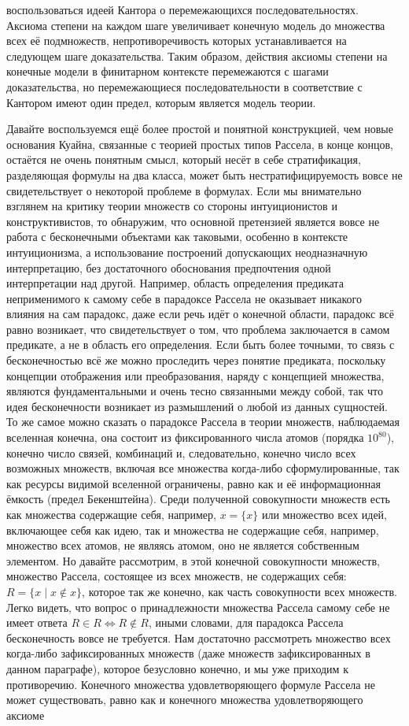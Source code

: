 \documentclass[12pt]{article}
\begin{document}
воспользоваться идеей Кантора о перемежающихся последовательностях. Аксиома степени на каждом шаге увеличивает конечную модель до множества всех её подмножеств, непротиворечивость которых устанавливается на следующем шаге доказательства. Таким образом, действия аксиомы степени на конечные модели в финитарном контексте перемежаются с шагами доказательства, но перемежающиеся последовательности в соответствие с Кантором имеют один предел, которым является модель теории. 

Давайте воспользуемся ещё более простой и понятной конструкцией, чем новые основания Куайна, связанные с теорией простых типов Рассела, в конце концов, остаётся не очень понятным смысл, который несёт в себе стратификация, разделяющая формулы на два класса, может быть нестратифицируемость вовсе не свидетельствует о некоторой проблеме в формулах. Если мы внимательно взглянем на критику теории множеств со стороны интуиционистов и конструктивистов, то обнаружим, что основной претензией является вовсе не работа с бесконечными объектами как таковыми, особенно в контексте интуиционизма, а использование построений допускающих неодназначную интерпретацию, без достаточного обоснования предпочтения одной интерпретации над другой. Например, область определения предиката неприменимого к самому себе в парадоксе Рассела не оказывает никакого влияния на сам парадокс, даже если речь идёт о конечной области, парадокс всё равно возникает, что свидетельствует о том, что проблема заключается в самом предикате, а не в область его определения. Если быть более точными, то связь с бесконечностью всё же можно проследить через понятие предиката, поскольку концепции отображения или преобразования, наряду с концепцией множества, являются фундаментальными и очень тесно связанными между собой, так что идея бесконечности возникает из размышлений о любой из данных сущностей. То же самое можно сказать о парадоксе Рассела в теории множеств, наблюдаемая вселенная конечна, она состоит из фиксированного числа атомов (порядка $10^{80}$), конечно число связей, комбинаций и, следовательно, конечно число всех возможных множеств, включая все множества когда-либо сформулированные, так как ресурсы видимой вселенной ограничены, равно как и её информационная ёмкость (предел Бекенштейна). Среди полученной совокупности множеств есть как множества содержащие себя, например, $x = \{ x \}$ или множество всех идей, включающее себя как идею, так и множества не содержащие себя, например, множество всех атомов, не являясь атомом, оно не является собственным элементом. Но давайте рассмотрим, в этой конечной совокупности множеств, множество Рассела, состоящее из всех множеств, не содержащих себя: $R = \{ x \mid x \notin x \}$, которое так же конечно, как часть совокупности всех множеств. Легко видеть, что вопрос о принадлежности множества Рассела самому себе не имеет ответа $R \in R \Leftrightarrow R \notin R$, иными словами, для парадокса Рассела бесконечность вовсе не требуется. Нам достаточно рассмотреть множество всех когда-либо зафиксированных множеств (даже множеств зафиксированных в данном параграфе), которое безусловно конечно, и мы уже приходим к противоречию. Конечного множества удовлетворяющего формуле Рассела не может существовать, равно как и конечного множества удовлетворяющего аксиоме 
\end{document}
